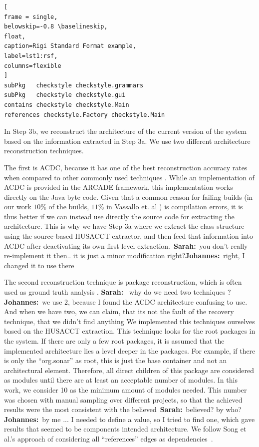 \documentclass[sigplan, anonymous, review]{acmart}
\newcommand{\sn}[1]{{\color{blue}\textbf{Sarah:}~#1}}
\newcommand{\jk}[1]{{\color{violet}\textbf{Johannes:}~#1}}
\begin{document}
\begin{lstlisting}[
frame = single, 
belowskip=-0.8 \baselineskip,
float,
caption=Rigi Standard Format example,
label=lst1:rsf,
columns=flexible
]
subPkg   checkstyle checkstyle.grammars
subPkg   checkstyle checkstyle.gui
contains checkstyle checkstyle.Main
references checkstyle.Factory checkstyle.Main
\end{lstlisting}



In Step 3b, we reconstruct the architecture of the current version of the system based on the information extracted in Step 3a. We use two different architecture reconstruction techniques.

The first is ACDC, because it has one of the best reconstruction accuracy rates when compared to other commonly used techniques \cite{arcRec-comparison}. 
While an implementation of ACDC is provided in the ARCADE framework, this implementation works directly on the Java byte code.  Given that a common reason for failing builds (in our work $10\%$ of the builds, $11\%$ in Vassallo et. al \cite{CIFailTypes}) is compilation errors, it is thus better if we can instead use directly the source code for extracting the architecture. This is why we have Step 3a where we extract the class structure using the source-based HUSACCT extractor, and then feed that information into ACDC after deactivating its own first level extraction.~\sn{you don't really re-implement it then.. it is just a minor modification right?}\jk{right, I changed it to use there}

The second reconstruction technique is package reconstruction, which is often used as ground truth analysis \cite{arcRec-comparison}. 
\sn{ why do we need two techniques ?} \jk{we use 2, because I found the ACDC architecture confusing to use. And when we have two, we can claim, that its not the fault of the recovery technique, that we didn't find anything} 
We implemented this techniques ourselves based on the HUSACCT extraction.
This technique looks for the root packages in the system. If there are only a few root packages, it is assumed that the implemented architecture lies a level deeper in the packages. For example, if there is only the ``org.sonar'' as root, this is just the base container and not an architectural element. Therefore, all direct children of this package are considered as modules until there are at least an acceptable number of modules. In this work, we consider 10 as the minimum amount of modules needed. This number was chosen with manual sampling over different projects, so that the achieved results were the most consistent with the believed~\sn{believed? by who?}\jk{by me ... I needed to define a value, so I tried to find one, which gave results that seemed to be components} intended architecture. We follow Song et al.'s approach of considering all ``references'' edges as dependencies~\cite{ArcAsGraph}. 
\end{document}
